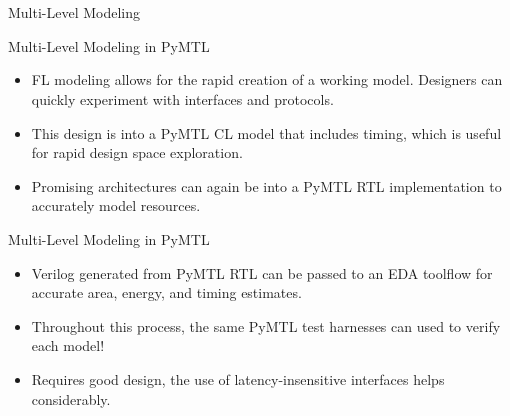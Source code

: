 
\section[{\it Presentation} Multi-Level Modeling]{}

\begin{frame}{Multi-Level Modeling}
\end{frame}

\begin{frame}{Multi-Level Modeling in PyMTL}
\begin{itemize}
  \item FL modeling allows for the rapid creation of a working model.
        Designers can quickly experiment with interfaces and protocols.
  \item This design is  into a PyMTL CL model that
        includes timing, which is useful for rapid design space exploration.
  \item Promising architectures can again be  into a
        PyMTL RTL implementation to accurately model resources.
\vspace{0.1in}
\end{itemize}
\end{frame}

\begin{frame}{Multi-Level Modeling in PyMTL}
\begin{itemize}
  \item Verilog generated from PyMTL RTL can be passed to an
        EDA toolflow for accurate area, energy, and timing estimates.
  \item Throughout this process, the same PyMTL test harnesses can used to
        verify each model!
  \item Requires good design, the use of latency-insensitive interfaces
        helps considerably.
\vspace{0.1in}
\end{itemize}
\end{frame}

